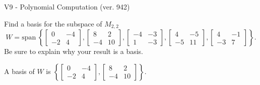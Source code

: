 \begin{exercise}
  \begin{exerciseTitle}V9 - Polynomial Computation (ver. 942)\end{exerciseTitle}
  \begin{exerciseStatement}
    Find a basis for the subspace of \(M_{2,2}\) 
\[W=\mathrm{span}\ \left\{\left[\begin{array}{cc}
0 & -4 \\
-2 & 4
\end{array}\right] , \left[\begin{array}{cc}
8 & 2 \\
-4 & 10
\end{array}\right] , \left[\begin{array}{cc}
-4 & -3 \\
1 & -3
\end{array}\right] , \left[\begin{array}{cc}
4 & -5 \\
-5 & 11
\end{array}\right] , \left[\begin{array}{cc}
4 & -1 \\
-3 & 7
\end{array}\right]\right\}.\]
 Be sure to explain why your result is a basis.


  \end{exerciseStatement}
  \begin{exerciseAnswer}
   A basis of \(W\) is  \(\left\{\left[\begin{array}{cc}
0 & -4 \\
-2 & 4
\end{array}\right] , \left[\begin{array}{cc}
8 & 2 \\
-4 & 10
\end{array}\right]\right\}\).
  


  \end{exerciseAnswer}
\end{exercise}